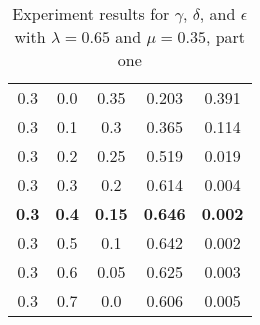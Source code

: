 \documentclass{article}
\begin{document}
\begin{table}[h!]
\begin{tabular}{|c|c|c||c|c|}
	\hline
	0.3 & 0.0 & 0.35 & 0.203 & 0.391 \\
	0.3 & 0.1 & 0.3 & 0.365 & 0.114 \\
	0.3 & 0.2 & 0.25 & 0.519 & 0.019 \\
	0.3 & 0.3 & 0.2 & 0.614 & 0.004 \\
	\textbf{0.3} & \textbf{0.4} & \textbf{0.15} & \textbf{0.646} & \textbf{0.002} \\
	0.3 & 0.5 & 0.1 & 0.642 & 0.002 \\
	0.3 & 0.6 & 0.05 & 0.625 & 0.003 \\
	0.3 & 0.7 & 0.0 & 0.606 & 0.005 \\
	\hline
\end{tabular}
\caption{Experiment results for $\gamma$, $\delta$, and $\epsilon$ with $\lambda = 0.65$ and $\mu = 0.35$, part one}
\label{table:gammaresults1}
\end{table}
\end{document}

